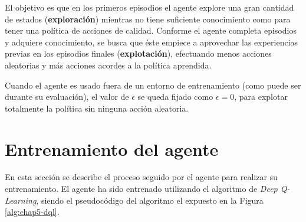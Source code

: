 El objetivo es que en los primeros episodios el agente explore una gran cantidad de estados (\textbf{exploración}) mientras no tiene suficiente conocimiento como para tener una política de acciones de calidad. Conforme el agente completa episodios y adquiere conocimiento, se busca que éste empiece a aprovechar las experiencias previas en los episodios finales (\textbf{explotación}), efectuando menos acciones aleatorias y más acciones acordes a la política aprendida.

Cuando el agente es usado fuera de un entorno de entrenamiento (como puede ser durante su evaluación), el valor de $\epsilon$ se queda fijado como $\epsilon=0$, para explotar totalmente la política sin ninguna acción aleatoria.

\section{Entrenamiento del agente}

En esta sección se describe el proceso seguido por el agente para realizar su entrenamiento. El agente ha sido entrenado utilizando el algoritmo de \textit{Deep Q-Learning}, siendo el pseudocódigo del algoritmo el expuesto en la Figura \ref{alg:chap5-dql}.


